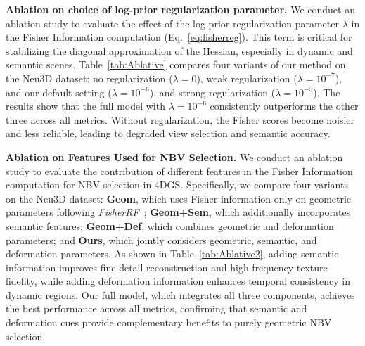 \noindent\textbf{Ablation on choice of log-prior regularization parameter.} 
We conduct an ablation study to evaluate the effect of the log-prior regularization parameter \( \lambda \) in the Fisher Information computation (Eq.~\ref{eq:fisherreg}). This term is critical for stabilizing the diagonal approximation of the Hessian, especially in dynamic and semantic scenes. Table~\ref{tab:Ablative} compares four variants of our method on the Neu3D dataset: no regularization (\( \lambda = 0 \)), weak regularization (\( \lambda = 10^{-7} \)), and our default setting (\( \lambda = 10^{-6} \)), and  strong regularization (\( \lambda = 10^{-5} \)). The results show that the full model with \( \lambda = 10^{-6} \) consistently outperforms the other three across all metrics. Without regularization, the Fisher scores become noisier and less reliable, leading to degraded view selection and semantic accuracy. 

\noindent\textbf{Ablation on Features Used for NBV Selection.} 
We conduct an ablation study to evaluate the contribution of different features in the Fisher Information computation for NBV selection in 4DGS. Specifically, we compare four variants on the Neu3D dataset: 
\textbf{Geom}, which uses Fisher information only on geometric parameters following \textit{FisherRF}~\cite{fisherrf}; 
\textbf{Geom+Sem}, which additionally incorporates semantic features; 
\textbf{Geom+Def}, which combines geometric and deformation parameters; and 
\textbf{Ours}, which jointly considers geometric, semantic, and deformation parameters. 
As shown in Table~\ref{tab:Ablative2}, adding semantic information improves fine-detail reconstruction and high-frequency texture fidelity, while adding deformation information enhances temporal consistency in dynamic regions. 
Our full model, which integrates all three components, achieves the best performance across all metrics, confirming that semantic and deformation cues provide complementary benefits to purely geometric NBV selection.










